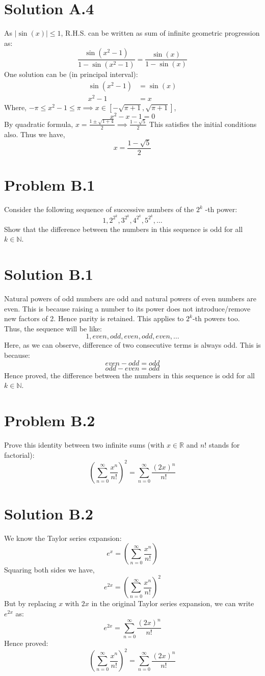 \documentclass{article}
\begin{document}
\section*{Solution A.4}
As $|\sin(x)| \leq 1$, R.H.S. can be written as sum of infinite geometric progression as:
\[\frac{\sin(x^{2}-1)}{1-\sin(x^{2}-1)}=\frac{\sin(x)}{1-\sin(x)}\]
One solution can be (in principal interval):
\begin{align*}
    \sin(x^{2}-1)&=\sin(x) \\
    x^{2}-1&=x
\end{align*}
Where, $-\pi \leq x^{2}-1 \leq \pi \implies x \in [-\sqrt{\pi+1}, \sqrt{\pi+1}]$,
\[x^2-x-1=0\]
By quadratic formula,
$x=\frac{1\pm \sqrt{1+4}}{2} \implies \frac{1-\sqrt{5}}{2}$
This satisfies the initial conditions also. Thus we have,
\[\boxed{x=\frac{1-\sqrt{5}}{2}}\]

\newpage
\section*{Problem B.1}
Consider the following sequence of successive numbers of the $2^{k}$ -th power:
\[
1,2^{2^{k}}, 3^{2^{k}}, 4^{2^{k}}, 5^{2^{k}}, \ldots
\]
Show that the difference between the numbers in this sequence is odd for all $k \in \mathbb{N}$.
\section*{Solution B.1}
Natural powers of odd numbers are odd and natural powers of even numbers are even. This is because raising a number to its power does not introduce/remove new factors of 2. Hence parity is retained. This applies to $2^{k}$-th powers too. \\
Thus, the sequence will be like:
\[1, even, odd, even, odd, even, \ldots\]
Here, as we can observe, difference of two consecutive terms is always odd. This is because:
\[even-odd = odd\]
\[odd-even = odd\]
Hence proved, the difference between the numbers in this sequence is odd for all $k \in \mathbb{N}$.

\newpage
\section*{Problem B.2}
Prove this identity between two infinite sums (with $x \in \mathbb{R}$ and $n$! stands for factorial):
\[
{\left(\sum_{n=0}^{\infty} \frac{x^{n}}{n!}\right)}^{2}=\sum_{n=0}^{\infty} \frac{{(2 x)}^{n}}{n!}
\]
\section*{Solution B.2}
We know the Taylor series expansion:
\[e^{x}=\left(\sum_{n=0}^{\infty} \frac{x^{n}}{n!}\right)\]
Squaring both sides we have,
\[e^{2x}={\left(\sum_{n=0}^{\infty} \frac{x^{n}}{n!}\right)}^{2}\]
But by replacing $x$ with $2x$ in the original Taylor series expansion, we can write $e^{2x}$ as:
\[e^{2x}=\sum_{n=0}^{\infty} \frac{{(2 x)}^{n}}{n!}\]
Hence proved:
\[\boxed{{\left(\sum_{n=0}^{\infty} \frac{x^{n}}{n!}\right)}^{2}=\sum_{n=0}^{\infty} \frac{{(2 x)}^{n}}{n!}}\]
\end{document}
